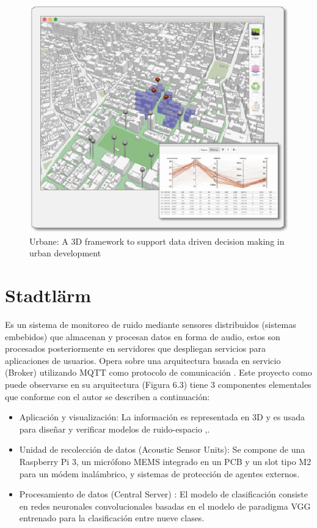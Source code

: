 \begin{figure}[H]
\centering
\includegraphics[width=0.6\linewidth]{bibliografia/Imagenes/Urbane.eps}

\caption{Urbane: A 3D framework to support data driven decision making in urban development \cite{Bello2018}}
\end{figure}

\section{Stadtlärm}
Es un sistema de monitoreo de ruido mediante sensores distribuidos (sistemas embebidos) que almacenan y procesan datos en forma de audio, estos son procesados posteriormente en servidores que despliegan servicios para aplicaciones de usuarios. Opera sobre una arquitectura basada en servicio (Broker) utilizando MQTT como protocolo de comunicación \cite{Abeer2019}. Este proyecto como puede observarse en su arquitectura (Figura 6.3) tiene 3 componentes elementales que conforme con el autor se describen a continuación:

\begin{itemize}
    \item Aplicación y visualización: La información es representada en 3D y es usada para diseñar y verificar modelos de ruido-espacio \cite{Abeer2019},\cite{DigitalMediaTechnology2016}.
    \item Unidad de recolección de datos (Acoustic Sensor Units): Se compone de una Raspberry Pi 3, un micrófono MEMS integrado en un PCB y un slot tipo M2 para un módem inalámbrico, y sistemas de protección de agentes externos\cite{Abeer2019}.
    \item Procesamiento de datos (Central Server) : El modelo de clasificación consiste en redes neuronales convolucionales basadas en el modelo de paradigma VGG entrenado para la clasificación entre nueve clases\cite{Abeer2019}.
\end{itemize}

